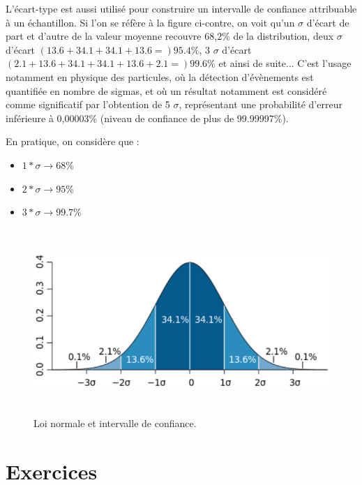 L'écart-type est aussi utilisé pour construire un intervalle de confiance attribuable à un échantillon. Si l'on se réfère à la figure ci-contre, on voit qu'un $\sigma$ d'écart de part et d'autre de la valeur moyenne recouvre 68,2\% de la distribution, deux $\sigma$ d'écart $(13.6+34.1+34.1+13.6 =) 95.4\%$, 3 $\sigma$ d'écart $(2.1+13.6+34.1+34.1+13.6+2.1 =) 99.6\%$ et ainsi de suite... C'est l'usage notamment en physique des particules, où la détection d'évènements est quantifiée en nombre de sigmas, et où un résultat notamment est considéré comme significatif par l'obtention de 5 $\sigma$, représentant une probabilité d'erreur inférieure à 0,00003\% (niveau de confiance de plus de 99.99997\%).

En pratique, on considère que :
\begin{itemize}

\item $1 * \sigma \rightarrow 68\% $
\item $2 * \sigma \rightarrow 95\% $
\item $3 * \sigma \rightarrow 99.7\%$

\end{itemize}


\begin{figure}
\centering
\includegraphics[height=7cm]{assets/figures/3_9_Loi_normale_et_intervale_de_confiance.PNG}
\caption{Loi normale et intervalle de confiance.}
\label{fig:3_9_Loi_normale_et_intervale_de_confiance}
\end{figure}

\section{Exercices }


